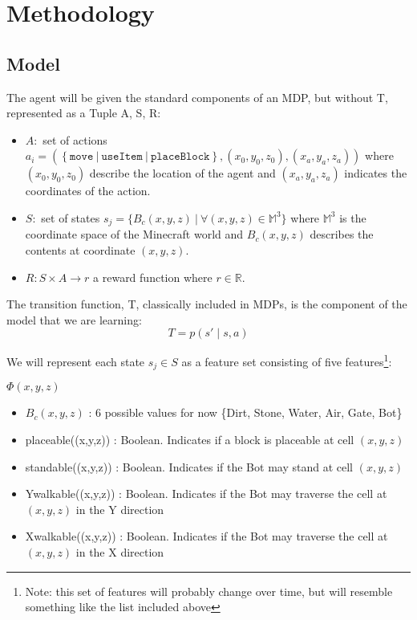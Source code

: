 \documentclass[a4paper]{article}
\begin{document}
\section{Methodology}

\subsection{Model}

The agent will be given the standard components of an MDP, but without T, represented as a Tuple {A, S, R}:
\begin{itemize}
\item $ A : $ set of actions $a_i = \left( \left \{\texttt{move}\ |\ \texttt{useItem}\ |\ \texttt{placeBlock}\right\}, (x_0,y_0,z_0), (x_a,y_a,z_a)\right)$ where $(x_0,y_0,z_0)$ describe the location of the agent and $(x_a,y_a,z_a)$ indicates the coordinates of the action.

\item $ S : $ set of states $s_j = \{B_c(x,y,z)\ |\ \forall (x, y, z) \in \mathbb{M}^3\}$ where  $\mathbb{M}^3$ is the coordinate space of the Minecraft world and $B_c(x,y,z)$ describes the contents at coordinate $(x,y,z)$.

\item $ R : S \times A \rightarrow r$ a reward function where $r \in \mathbb{R}$.
\end{itemize}

The transition function, T, classically included in MDPs, is the component of the model that we are learning:
\[
T = p(s'\mid s,a)
\tag{1} 
\]

We will represent each state $s_j \in S$ as a feature set consisting of five features\footnote{Note: this set of features will probably change over time, but will resemble something like the list included above}:

$\Phi(x,y,z)$
\begin{itemize}
\item $B_c(x,y,z)$ : 6 possible values for now \{Dirt, Stone, Water, Air, Gate, Bot\}
\item placeable((x,y,z)) : Boolean. Indicates if a block is placeable at cell $(x,y,z)$
\item standable((x,y,z)) : Boolean. Indicates if the Bot may stand at cell $(x,y,z)$
\item Ywalkable((x,y,z)) : Boolean. Indicates if the Bot may traverse the cell at $(x,y,z)$ in the Y direction
\item Xwalkable((x,y,z)) : Boolean. Indicates if the Bot may traverse the cell at $(x,y,z)$ in the X direction
\end{itemize}
\end{document}

